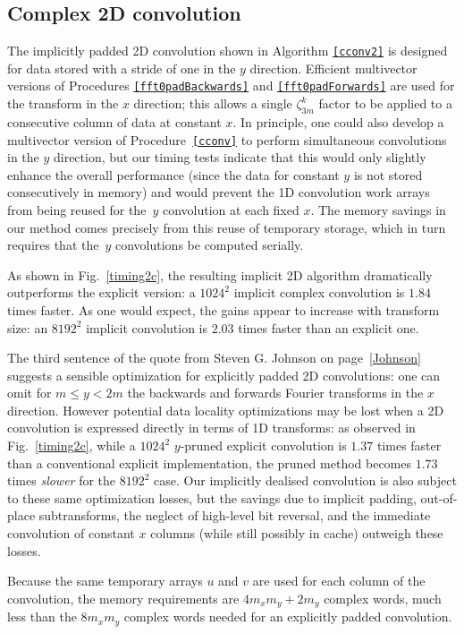 \documentclass[final]{siamltex}
\begin{document}
\subsection{Complex 2D convolution}
The implicitly padded 2D convolution shown in Algorithm {\tt\ref{cconv2}} 
is designed for data stored with a stride of one in the $y$
direction. Efficient multivector versions of Procedures {\tt\ref{fft0padBackwards}}
and {\tt\ref{fft0padForwards}} are used for the transform in the $x$ direction;
this allows a single $\zeta_{3m}^k$ factor to be applied to a consecutive
column of data at constant $x$. In principle, one could also develop a
multivector version of Procedure~{\tt\ref{cconv}} to perform simultaneous
convolutions in the $y$ direction, but our timing tests indicate that this
would only slightly enhance the overall performance (since the data for constant
$y$ is not stored consecutively in memory) and would prevent the 1D convolution
work arrays from being reused for the~$y$ convolution at each fixed $x$. The
memory savings in our method comes precisely from this reuse of temporary
storage, which in turn requires that the~$y$ convolutions be computed
serially.

As shown in Fig.~\ref{timing2c}, the resulting implicit
2D algorithm dramatically outperforms the explicit version:
a $1024^2$ implicit complex convolution is $1.84$ times faster.
As one would expect, the gains appear to increase with transform size: an
$8192^2$ implicit convolution is $2.03$ times faster than an explicit one. 

The third sentence of the quote from Steven G. Johnson on
page~\ref{Johnson} suggests a sensible optimization for
explicitly padded 2D convolutions: one can omit for $m \le y < 2m$
the backwards and forwards Fourier transforms in the $x$ direction.
However potential data locality optimizations may be lost
when a 2D convolution is expressed directly in terms of 1D transforms: as
observed in Fig.~\ref{timing2c}, while a $1024^2$ $y$-pruned explicit
convolution is $1.37$ times faster than a conventional explicit
implementation, the pruned method becomes $1.73$ times {\it slower} for the
$8192^2$ case. Our implicitly dealised convolution is also subject
to these same optimization losses, but the savings due to implicit padding,
out-of-place subtransforms, the neglect of high-level bit reversal, and the
immediate convolution of constant $x$ columns (while still possibly in
cache) outweigh these losses.

Because the same temporary arrays $u$ and $v$ are used for each column
of the convolution, the memory requirements are $4m_xm_y+2m_y$ complex
words, much less than the $8m_xm_y$ complex words needed for an
explicitly padded convolution.
\end{document}
